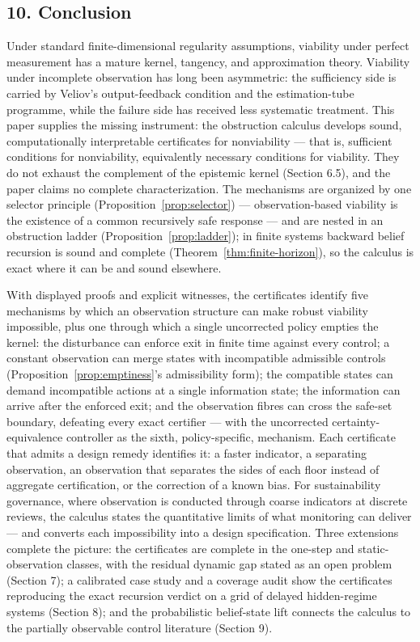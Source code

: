 \documentclass[10pt,twocolumn]{article}
\theoremstyle{definition}
\begin{document}
\subsection{10. Conclusion}\label{conclusion}

Under standard finite-dimensional regularity assumptions, viability under perfect measurement has a mature kernel, tangency, and approximation theory. Viability under incomplete observation has
long been asymmetric: the sufficiency side is carried by Veliov's
output-feedback condition and the estimation-tube programme, while the failure side has received less systematic treatment. This paper supplies the missing instrument: the obstruction calculus develops sound, computationally interpretable certificates for nonviability --- that is, sufficient conditions for nonviability, equivalently necessary conditions for viability. They do not exhaust the complement of the epistemic kernel (Section 6.5), and the paper claims no complete characterization. The mechanisms
are organized by one selector principle (Proposition~\ref{prop:selector}) --- observation-based viability
is the existence of a common recursively safe response --- and are
nested in an obstruction ladder (Proposition~\ref{prop:ladder}); in
finite systems backward belief recursion is sound and complete
(Theorem~\ref{thm:finite-horizon}), so the calculus is exact where it
can be and sound elsewhere.

With displayed proofs and explicit witnesses, the certificates identify
five mechanisms by which an observation structure can make robust
viability impossible, plus one through which a single uncorrected policy
empties the kernel: the disturbance can enforce exit in finite time
against every control; a constant observation can merge states with
incompatible admissible controls (Proposition~\ref{prop:emptiness}'s admissibility form);
the compatible states can demand incompatible actions at a single
information state; the information can arrive after the enforced exit;
and the observation fibres can cross the safe-set boundary, defeating
every exact certifier --- with the uncorrected certainty-equivalence controller as the
sixth, policy-specific, mechanism. Each certificate that admits a design
remedy identifies it: a faster indicator, a separating observation, an
observation that separates the sides of each floor instead of aggregate
certification, or the correction of a known bias. For sustainability
governance, where observation is conducted through coarse indicators at
discrete reviews, the calculus states the quantitative limits of what
monitoring can deliver --- and converts each impossibility into a design
specification. Three extensions complete the picture: the certificates are complete in the one-step and static-observation classes, with the residual dynamic gap stated as an open problem (Section 7); a calibrated case study and a coverage audit show the certificates reproducing the exact recursion verdict on a grid of delayed hidden-regime systems (Section 8); and the probabilistic belief-state lift connects the calculus to the partially observable control literature (Section 9).
\end{document}
